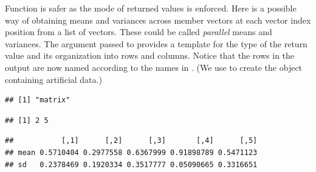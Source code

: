 \documentclass[krantz2]{krantz}\usepackage{knitr}%
\begin{document}
Function  is safer as the mode of returned values is enforced. Here is a possible way of obtaining means and variances across member vectors at each vector index position from a list of vectors. These could be called \emph{parallel} means and variances. The argument passed to  provides a template for the type of the return value and its organization into rows and columns. Notice that the rows in the output are now named according to the names in . (We use  to create the object  containing artificial data.)

\begin{knitrout}\footnotesize
{}\color{fgcolor}\begin{kframe}
\begin{alltt}
 \hlkwb{<-} \hlstd{(}\hlstd{,}  \hlstd{=} \hlstd{) \{}
       \hlstd{(}      
    \hlstd{\}}
\hlstd{(}\hlstd{)}
 \hlkwb{<-} \hlstd{(}\hlstd{(}\hlstd{,} 
 \hlkwb{<-} \hlstd{(} 
                  
                  \hlstd{=} \hlstd{(} \hlstd{=} \hlstd{,}  \hlstd{=} \hlstd{),}
                  \hlstd{=} \hlstd{)}
\end{alltt}
\begin{verbatim}
## [1] "matrix"
\end{verbatim}
\begin{alltt}
\end{alltt}
\begin{verbatim}
## [1] 2 5
\end{verbatim}
\begin{alltt}
\end{alltt}
\begin{verbatim}
##           [,1]      [,2]      [,3]       [,4]      [,5]
## mean 0.5710404 0.2977558 0.6367999 0.91898789 0.5471123
## sd   0.2378469 0.1920334 0.3517777 0.05090665 0.3316651
\end{verbatim}
\end{kframe}
\end{knitrout}
\end{document}
